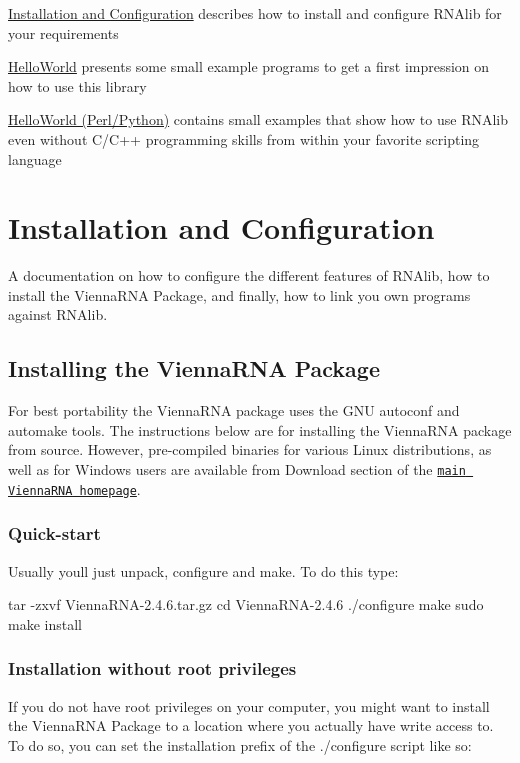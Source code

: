 
\begin{DoxyItemize}
\item \hyperlink{install}{Installation and Configuration} describes how to install and configure {\ttfamily R\+N\+Alib} for your requirements
\item \hyperlink{helloworld}{Hello\+World} presents some small example programs to get a first impression on how to use this library
\item \hyperlink{helloworld_swig}{Hello\+World (Perl/\+Python)} contains small examples that show how to use R\+N\+Alib even without C/\+C++ programming skills from within your favorite scripting language 
\end{DoxyItemize}\hypertarget{install}{}\section{Installation and Configuration}\label{install}
A documentation on how to configure the different features of {\ttfamily R\+N\+Alib}, how to install the Vienna\+R\+NA Package, and finally, how to link you own programs against {\ttfamily R\+N\+Alib}.\hypertarget{install_installation}{}\subsection{Installing the Vienna\+R\+N\+A Package}\label{install_installation}
For best portability the Vienna\+R\+NA package uses the G\+NU autoconf and automake tools. The instructions below are for installing the Vienna\+R\+NA package from source. However, pre-\/compiled binaries for various Linux distributions, as well as for Windows users are available from Download section of the \href{https://www.tbi.univie.ac.at/RNA}{\tt main Vienna\+R\+NA homepage}.\hypertarget{install_quickstart}{}\subsubsection{Quick-\/start}\label{install_quickstart}
Usually you\textquotesingle{}ll just unpack, configure and make. To do this type\+:

\begin{DoxyVerb}tar -zxvf ViennaRNA-2.4.6.tar.gz
cd ViennaRNA-2.4.6
./configure
make
sudo make install
\end{DoxyVerb}
\hypertarget{install_userdir_install}{}\subsubsection{Installation without root privileges}\label{install_userdir_install}
If you do not have root privileges on your computer, you might want to install the Vienna\+R\+NA Package to a location where you actually have write access to. To do so, you can set the installation prefix of the ./configure script like so\+:

